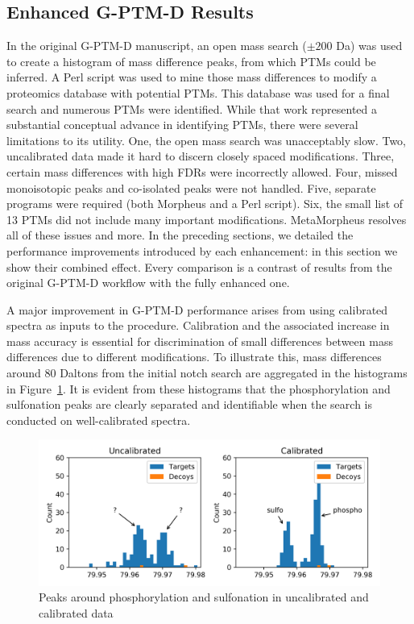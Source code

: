 \documentclass[journal=jprobs,manuscript=article]{achemso}
\begin{document}
\subsection{Enhanced G-PTM-D Results}

In the original G-PTM-D manuscript\citep{Li_2016}, an open mass search ($\pm 200$ Da) was used to create a histogram of mass difference peaks, from which PTMs could be inferred.
A Perl script was used to mine those mass differences to modify a proteomics database with potential PTMs.
This database was used for a final search and numerous PTMs were identified.
While that work represented a substantial conceptual advance in identifying PTMs, there were several limitations to its utility.
One, the open mass search was unacceptably slow.
Two, uncalibrated data made it hard to discern closely spaced modifications.
Three, certain mass differences with high FDRs were incorrectly allowed.
Four, missed monoisotopic peaks and co-isolated peaks were not handled.
Five, separate programs were required (both Morpheus and a Perl script).
Six, the small list of 13 PTMs did not include many important modifications.
MetaMorpheus resolves all of these issues and more.
In the preceding sections, we detailed the performance improvements introduced by each enhancement: in this section we show their combined effect.
Every comparison is a contrast of results from the original G-PTM-D workflow with the fully enhanced one.

A major improvement in G-PTM-D performance arises from using calibrated spectra as inputs to the procedure.
Calibration and the associated increase in mass accuracy is essential for discrimination of small differences between mass differences due to different modifications.
To illustrate this, mass differences around 80 Daltons from the initial notch search are aggregated in the histograms in Figure~\ref{fig:fig7-PhosphoAndSulfo}.
It is evident from these histograms that the phosphorylation and sulfonation peaks are clearly separated and identifiable when the search is conducted on well-calibrated spectra.


\begin{figure}[H]
\includegraphics{fig7-SulfoAndPhospho.png}
\caption{Peaks around phosphorylation and sulfonation in uncalibrated and calibrated data}
\label{fig:fig7-PhosphoAndSulfo}
\end{figure}
\end{document}
